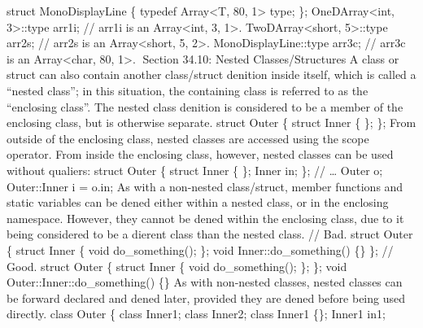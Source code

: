 struct MonoDisplayLine \{ typedef Array\textless T, 80, 1\textgreater{}
type; \}; OneDArray\textless int, 3\textgreater::type arr1i; // arr1i is
an Array\textless int, 3, 1\textgreater. TwoDArray\textless short,
5\textgreater::type arr2s; // arr2s is an Array\textless short, 5,
2\textgreater. MonoDisplayLine::type arr3c; // arr3c is an
Array\textless char, 80, 1\textgreater. Section 34.10: Nested
Classes/Structures A class or struct can also contain another
class/struct denition inside itself, which is called a ``nested class'';
in this situation, the containing class is referred to as the
``enclosing class''. The nested class denition is considered to be a
member of the enclosing class, but is otherwise separate. struct Outer
\{ struct Inner \{ \}; \}; From outside of the enclosing class, nested
classes are accessed using the scope operator. From inside the enclosing
class, however, nested classes can be used without qualiers: struct
Outer \{ struct Inner \{ \}; Inner in; \}; // \ldots{} Outer o;
Outer::Inner i = o.in; As with a non-nested class/struct, member
functions and static variables can be dened either within a nested
class, or in the enclosing namespace. However, they cannot be dened
within the enclosing class, due to it being considered to be a dierent
class than the nested class. // Bad. struct Outer \{ struct Inner \{
void do\_something(); \}; void Inner::do\_something() \{\} \}; // Good.
struct Outer \{ struct Inner \{ void do\_something(); \}; \}; void
Outer::Inner::do\_something() \{\} As with non-nested classes, nested
classes can be forward declared and dened later, provided they are dened
before being used directly. class Outer \{ class Inner1; class Inner2;
class Inner1 \{\}; Inner1 in1;
